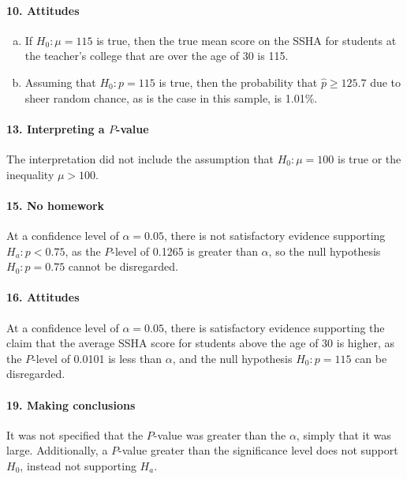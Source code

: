 \documentclass[12pt, A4]{article}
\begin{document}
		\paragraph{10. Attitudes}
			\begin{enumerate}[a.]
				\item
					If $H_0:\mu = 115$ is true, then the true mean score on the SSHA for students at the teacher's college that are over the age of 30 is 115.
				\item
					Assuming that $H_0:p = 115$ is true, then the probability that $\hat{p} \ge 125.7$ due to sheer random chance, as is the case in this sample, is 1.01\%.
			\end{enumerate}
		\paragraph{13. Interpreting a $P$-value}
			The interpretation did not include the assumption that $H_0:\mu = 100$ is true or the inequality $\mu > 100$.
		\paragraph{15. No homework}
			At a confidence level of $\alpha = 0.05$, there is not satisfactory evidence supporting $H_a:p < 0.75$, as the $P$-level of 0.1265 is greater than $\alpha$, so the null hypothesis $H_0:p = 0.75$ cannot be disregarded.
		\paragraph{16. Attitudes}
			At a confidence level of $\alpha = 0.05$, there is satisfactory evidence supporting the claim that the average SSHA score for students above the age of 30 is higher, as the $P$-level of 0.0101 is less than $\alpha$, and the null hypothesis $H_0: p = 115$ can be disregarded.
		\paragraph{19. Making conclusions}
			It was not specified that the $P$-value was greater than the $\alpha$, simply that it was large. Additionally, a $P$-value greater than the significance level does not support $H_0$, instead not supporting $H_a$.
\end{document}

